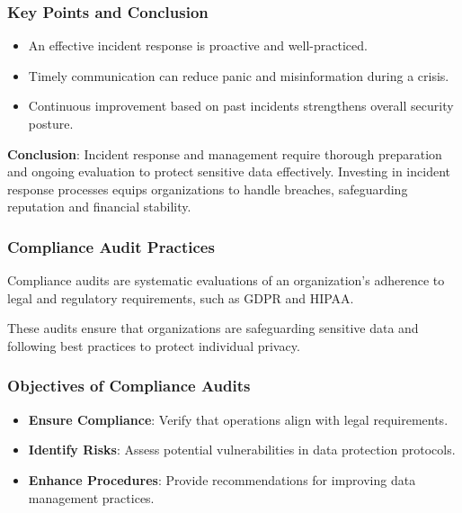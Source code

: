 \documentclass{beamer}
\begin{document}
\begin{frame}[fragile]
    \frametitle{Key Points and Conclusion}
    \begin{itemize}
        \item An effective incident response is proactive and well-practiced.
        \item Timely communication can reduce panic and misinformation during a crisis.
        \item Continuous improvement based on past incidents strengthens overall security posture.
    \end{itemize}
    \vspace{1em}
    \textbf{Conclusion}: Incident response and management require thorough preparation and ongoing evaluation to protect sensitive data effectively. Investing in incident response processes equips organizations to handle breaches, safeguarding reputation and financial stability.
\end{frame}

\begin{frame}[fragile]
    \frametitle{Compliance Audit Practices}
    Compliance audits are systematic evaluations of an organization’s adherence to legal and regulatory requirements, such as GDPR and HIPAA.
    
    These audits ensure that organizations are safeguarding sensitive data and following best practices to protect individual privacy.
\end{frame}

\begin{frame}[fragile]
    \frametitle{Objectives of Compliance Audits}
    \begin{itemize}
        \item \textbf{Ensure Compliance}: Verify that operations align with legal requirements.
        \item \textbf{Identify Risks}: Assess potential vulnerabilities in data protection protocols.
        \item \textbf{Enhance Procedures}: Provide recommendations for improving data management practices.
    \end{itemize}
\end{frame}
\end{document}
